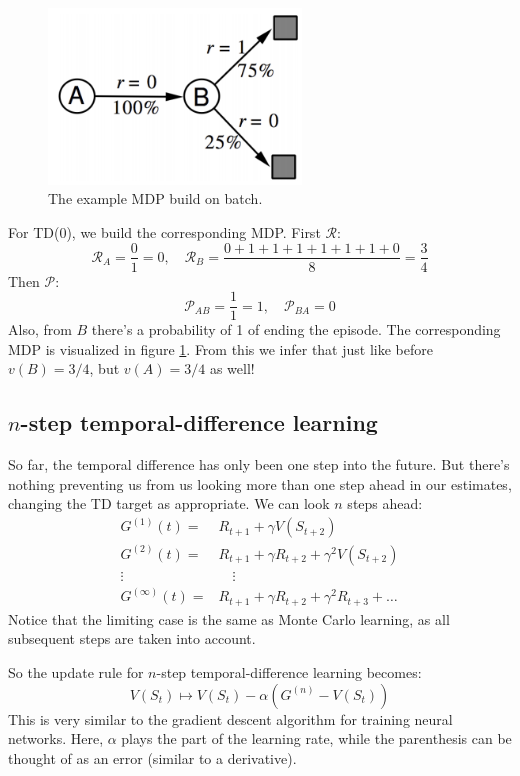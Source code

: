 \documentclass[12pt, a4paper]{article}
\numberwithin{equation}{section}
\begin{document}
\begin{figure}
\centering
\includegraphics[width=0.6\textwidth]{batch_mdp}
\caption{The example MDP build on batch.}
\label{fig:batch_mdp}
\end{figure}


For TD(0), we build the corresponding MDP. First $\mathcal{R}$:
\begin{equation}
\mathcal{R}_A=\frac{0}{1}=0,\quad
\mathcal{R}_B=\frac{0+1+1+1+1+1+1+0}{8}=\frac{3}{4}
\end{equation}
Then $\mathcal{P}$:
\begin{equation}
\mathcal{P}_{AB}=\frac{1}{1}=1,\quad\mathcal{P}_{BA}=0
\end{equation}
Also, from $B$ there's a probability of 1 of ending the episode. The corresponding MDP is visualized in figure \ref{fig:batch_mdp}. From this we infer that just like before $v(B)=3/4$, but $v(A)=3/4$ as well!

\subsection{$n$-step temporal-difference learning}
So far, the temporal difference has only been one step into the future. But there's nothing preventing us from us looking more than one step ahead in our estimates, changing the TD target as appropriate. We can look $n$ steps ahead:
\begin{align}
G^{(1)}(t)=&R_{t+1}+\gamma V(S_{t+2})\\
G^{(2)}(t)=&R_{t+1}+\gamma R_{t+2}+\gamma^2 V(S_{t+2})\\
\vdots\quad & \quad\vdots\\
G^{(\infty)}(t)=&R_{t+1}+\gamma R_{t+2}+\gamma^2 R_{t+3}+\dots
\end{align}
Notice that the limiting case is the same as Monte Carlo learning, as all subsequent steps are taken into account. 

So the update rule for $n$-step temporal-difference learning becomes:
\begin{equation}
V(S_t)\mapsto V(S_t)-\alpha(G^{(n)}-V(S_t))
\end{equation}
This is very similar to the gradient descent algorithm for training neural networks. Here, $\alpha$ plays the part of the learning rate, while the parenthesis can be thought of as an error (similar to a derivative).
\end{document}
